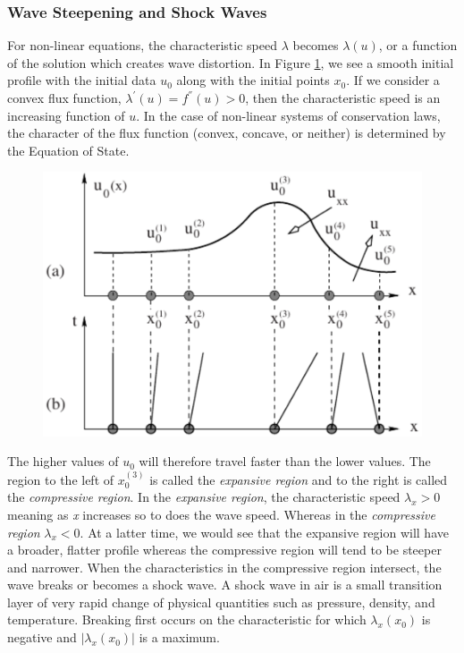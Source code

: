 \documentclass[]{article}
\begin{document}
		\subsubsection{Wave Steepening and Shock Waves}
			For non-linear equations, the characteristic speed $ \lambda $ becomes $ \lambda(u) $, or a function of the solution which creates wave distortion. In Figure \ref{WaveDistortion}, we see a smooth initial profile with the initial data $ u_0 $ along with the initial points $ x_0 $. If we consider a convex flux function, $ \lambda^{'}(u) = f^{''}(u) > 0 $, then the characteristic speed  is an increasing function of $ u $. In the case of non-linear systems of conservation laws, the character of the flux function (convex, concave, or neither) is determined by the Equation of State.
			\begin{figure}[h] 	
				\centering
				\includegraphics[scale=.50]{WaveDistortion}
				\caption{}
				\label{WaveDistortion}
			\end{figure}
			The higher values of $ u_0$ will therefore travel faster than the lower values. The region to the left of $ x_0^{(3)} $ is called the \textit{expansive region} and to the right is called the \textit{compressive region}. In the \textit{expansive region}, the characteristic speed $ \lambda_x > 0$ meaning as \textit{x} increases so to does the wave speed. Whereas in the \textit{compressive region} $ \lambda_x < 0 $. At a latter time, we would see that the expansive region will have a broader, flatter profile whereas the compressive region will tend to be steeper and narrower. When the characteristics in the compressive region intersect, the wave breaks or becomes a shock wave. A shock wave in air is a small transition layer of very rapid change of physical quantities such as pressure, density, and temperature. Breaking first occurs on the characteristic for which $ \lambda_x(x_0) $ is negative and $ |\lambda_x(x_0)| $ is a maximum.
		
\end{document}
